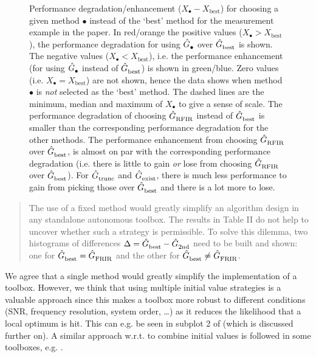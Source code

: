 \begin{figure}
  \centering
  \setlength{\figurewidth}{0.75\columnwidth}
  \setlength{\figureheight}{0.60\figurewidth}
  
  \caption[Performance degradation/enhancement for selecting the second best model.]{
  Performance degradation/enhancement ($X_{\bullet}-X_{\mathrm{best}}$) for choosing a given method $\bullet$ instead of the `best' method for the measurement example in the paper.
  In red/orange the positive values ($X_{\bullet} > X_{\mathrm{best}}$), the performance degradation for using $\hat{G}_{\mathrm{\bullet}}^{\mathrm{}}$ over $\hat{G}_{\mathrm{best}}^{\mathrm{}}$ is shown.
  The negative values ($X_{\bullet} < X_{\mathrm{best}}$), i.e. the performance enhancement (for using $\hat{G}_{\mathrm{\bullet}}^{\mathrm{}}$ instead of $\hat{G}_{\mathrm{best}}^{\mathrm{}}$) is shown in green/blue.
  Zero values (i.e. $X_{\bullet} = X_{\mathrm{best}}$) are not shown, hence the data shows when method $\bullet$ is \emph{not} selected as the `best' method.
  The dashed lines are the minimum, median and maximum of $X_{\bullet}$ to give a sense of scale.
  The performance degradation of choosing $\hat{G}_{\mathrm{RFIR}}^{\mathrm{}}$ instead of $\hat{G}_{\mathrm{best}}^{\mathrm{}}$ is smaller than the corresponding performance degradation for the other methods.
  The performance enhancement from choosing $\hat{G}_{\mathrm{RFIR}}^{\mathrm{}}$ over $\hat{G}_{\mathrm{best}}^{\mathrm{}}$, is almost on par with the corresponding performance degradation (i.e. there is little to gain \emph{or} lose from choosing $\hat{G}_{\mathrm{RFIR}}^{\mathrm{}}$ over $\hat{G}_{\mathrm{best}}^{\mathrm{}}$).
  For $\hat{G}_{\mathrm{trunc}}^{\mathrm{}}$ and $\hat{G}_{\mathrm{exist}}^{\mathrm{}}$, there is much less performance to gain from picking those over $\hat{G}_{\mathrm{best}}^{\mathrm{}}$ and there is a lot more to lose.
  }
  \label{fig:histogram}
\end{figure}

\begin{quote}

The use of a fixed method would greatly simplify an algorithm design in any standalone autonomous toolbox. The results in Table II do not help to uncover whether such a strategy is permissible. To solve this dilemma, two histograms of differences $\Delta = \hat{G}_{\mathrm{best}}^{\mathrm{}} - \hat{G}_{\mathrm{2nd}}^{\mathrm{}}$ need to be built and shown: one for $\hat{G}_{\mathrm{best}}^{\mathrm{}} = \hat{G}_{\mathrm{FRIR}}^{\mathrm{}}$ and the other for $\hat{G}_{\mathrm{best}}^{\mathrm{}} \neq \hat{G}_{\mathrm{FRIR}}^{\mathrm{}}$. 
\end{quote}

We agree that a single method would greatly simplify the implementation of a toolbox.
However, we think that using multiple initial value strategies is a valuable approach since this makes a toolbox more robust to different conditions (SNR, frequency resolution, system order, \ldots) as it reduces the likelihood that a local optimum is hit.
This can e.g. be seen in subplot 2 of  (which is discussed further on).
A similar approach w.r.t. to combine initial values is followed in some toolboxes, e.g. \cite{FDIDENT,TDIDENT}.

